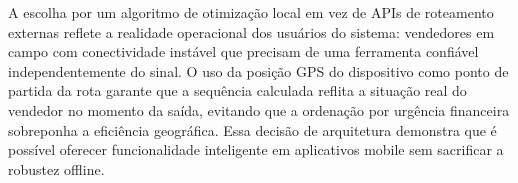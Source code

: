 \documentclass[
	12pt,				%
	oneside,			%
	a4paper,			%
	english,			%
	brazil				%
	]{abntex2}
\begin{document}
A escolha por um algoritmo de otimização local em vez de APIs de roteamento externas reflete a realidade operacional dos usuários do sistema: vendedores em campo com conectividade instável que precisam de uma ferramenta confiável independentemente do sinal. O uso da posição GPS do dispositivo como ponto de partida da rota garante que a sequência calculada reflita a situação real do vendedor no momento da saída, evitando que a ordenação por urgência financeira sobreponha a eficiência geográfica. Essa decisão de arquitetura demonstra que é possível oferecer funcionalidade inteligente em aplicativos mobile sem sacrificar a robustez offline.

\postextual


\end{document}
